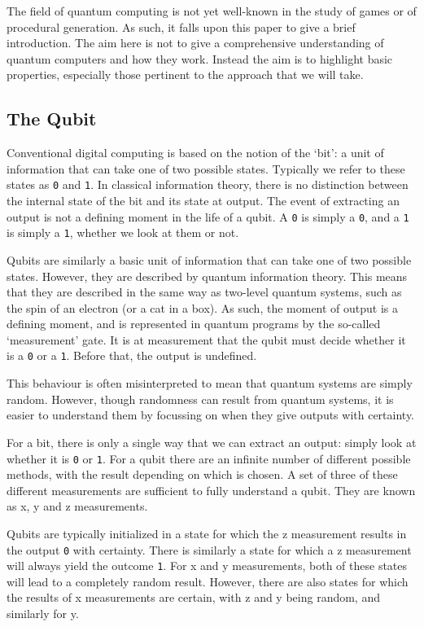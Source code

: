 \documentclass[conference]{IEEEtran}
\begin{document}
The field of quantum computing is not yet well-known in the study of games or of procedural generation. As such, it falls upon this paper to give a brief introduction. The aim here is not to give a comprehensive understanding of quantum computers and how they work. Instead the aim is to highlight basic properties, especially those pertinent to the approach that we will take.


\subsection{The Qubit}

Conventional digital computing is based on the notion of the `bit': a unit of information that can take one of two possible states. Typically we refer to these states as \texttt{0} and \texttt{1}. In classical information theory, there is no distinction between the internal state of the bit and its state at output. The event of extracting an output is not a defining moment in the life of a qubit. A \texttt{0} is simply a \texttt{0}, and a \texttt{1} is simply a \texttt{1}, whether we look at them or not.

Qubits are similarly a basic unit of information that can take one of two possible states. However, they are described by quantum information theory. This means that they are described in the same way as two-level quantum systems, such as the spin of an electron (or a cat in a box). As such, the moment of output is a defining moment, and is represented in quantum programs by the so-called `measurement' gate. It is at measurement that the qubit must decide whether it is a \texttt{0} or a \texttt{1}. Before that, the output is undefined.

This behaviour is often misinterpreted to mean that quantum systems are simply random. However, though randomness can result from quantum systems, it is easier to understand them by focussing on when they give outputs with certainty.

For a bit, there is only a single way that we can extract an output: simply look at whether it is \texttt{0} or \texttt{1}. For a qubit there are an infinite number of different possible methods, with the result depending on which is chosen. A set of three of these different measurements are sufficient to fully understand a qubit. They are known as x, y and z measurements.

Qubits are typically initialized in a state for which the z measurement results in the output \texttt{0} with certainty. There is similarly a state for which a z measurement will always yield the outcome \texttt{1}. For x and y measurements, both of these states will lead to a completely random result. However, there are also states for which the results of x measurements are certain, with z and y being random, and similarly for y.
\end{document}
